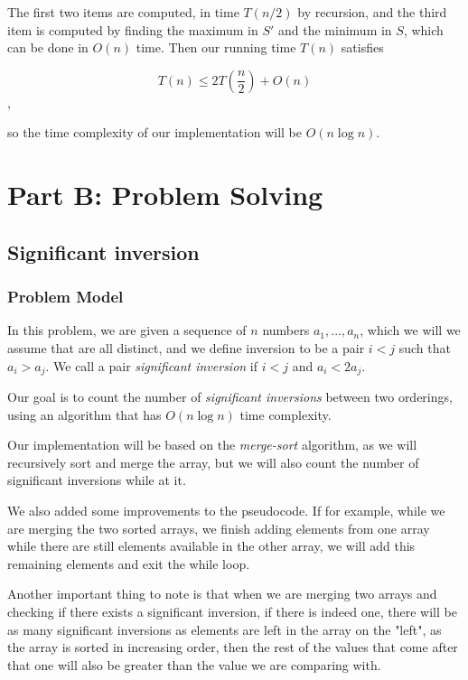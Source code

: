 \documentclass{article}
\begin{document}
The first two items are computed, in time $T(n/2)$ by recursion, and the third item is computed by finding the maximum in $S'$ and the minimum in $S$, which can be done in $O(n)$ time. Then our running time $T(n)$ satisfies

$$T(n) \leq 2T(\frac{n}{2})+O(n)$$,

so the time complexity of our implementation will be $O(n\log n)$.


\section*{Part B: Problem Solving}

\subsection*{Significant inversion}

\subsubsection*{Problem Model}

In this problem, we are given a sequence of $n$ numbers $a_1,...,a_n$, which we will we assume that are all distinct, and we define inversion to be a pair $i<j$ such that $a_i>a_j$. We call a pair \textit{significant inversion} if $i<j$ and $a_i<2a_j$.

Our goal is to count the number of \textit{significant inversions} between two orderings, using an algorithm that has $O(n \log n)$ time complexity.

Our implementation will be based on the \textit{merge-sort} algorithm, as we will recursively sort and merge the array, but we will also count the number of significant inversions while at it.

We also added some improvements to the pseudocode. If for example, while we are merging the two sorted arrays, we finish adding elements from one array while there are still elements available in the other array, we will add this remaining elements and exit the while loop.

Another important thing to note is that when we are merging two arrays and checking if there exists a significant inversion, if there is indeed one, there will be as many significant inversions as elements are left in the array on the "left", as the array is sorted in increasing order, then the rest of the values that come after that one will also be greater than the value we are comparing with.
\end{document}

